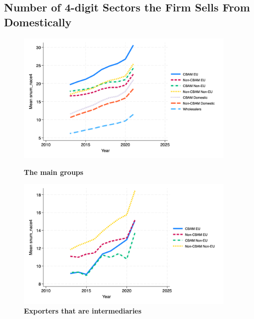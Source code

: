 \documentclass{article}
\begin{document}
\subsection{Number of 4-digit Sectors the Firm Sells From Domestically}
\begin{figure}[H]
\centering
\includegraphics[width=0.95\textwidth]{snum_nace4_main_groups.png}
\caption{\textbf{The main groups}}
\includegraphics[width=0.95\textwidth]{snum_nace4_ei.png}
\caption{\textbf{Exporters that are intermediaries}}
\end{figure}
\end{document}
